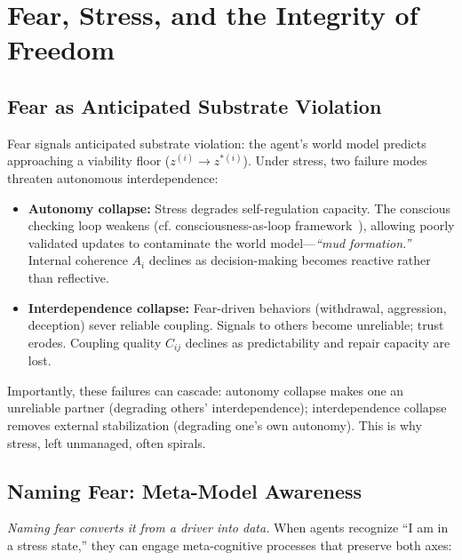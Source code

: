 \documentclass[11pt,a4paper]{article}
\begin{document}
\section{Fear, Stress, and the Integrity of Freedom}

\subsection{Fear as Anticipated Substrate Violation}

Fear signals anticipated substrate violation: the agent's world model predicts approaching a viability floor ($z^{(i)} \to z^{*(i)}$). Under stress, two failure modes threaten autonomous interdependence:

\begin{itemize}
    \item \textbf{Autonomy collapse:} Stress degrades self-regulation capacity. The conscious checking loop weakens (cf. consciousness-as-loop framework~\cite{appendixXI}), allowing poorly validated updates to contaminate the world model---\emph{``mud formation.''} Internal coherence $A_i$ declines as decision-making becomes reactive rather than reflective.
    
    \item \textbf{Interdependence collapse:} Fear-driven behaviors (withdrawal, aggression, deception) sever reliable coupling. Signals to others become unreliable; trust erodes. Coupling quality $C_{ij}$ declines as predictability and repair capacity are lost.
\end{itemize}

Importantly, these failures can cascade: autonomy collapse makes one an unreliable partner (degrading others' interdependence); interdependence collapse removes external stabilization (degrading one's own autonomy). This is why stress, left unmanaged, often spirals.

\subsection{Naming Fear: Meta-Model Awareness}

\emph{Naming fear converts it from a driver into data.} When agents recognize ``I am in a stress state,'' they can engage meta-cognitive processes that preserve both axes:
\end{document}
